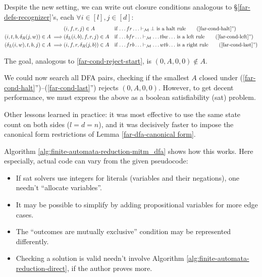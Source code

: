 Despite the new setting, we can write out closure conditions analogous to \S\ref{far-defs-recognizer}'s, each $\forall i\in[l],j\in[d]$:
\begin{align}
                                           & (i,f,r,j)\in A
                                           &                               & \text{if $\ldots fr\ldots\vdash_\mathcal{M}\bot$ is a halt rule}
    \tag{\ref{far-cond-halt}''}
    \\
    (i, t, b, \delta_R(j,w))\in A \implies & (\delta_L(i,b), f, r, j)\in A
                                           &                               & \text{if $\ldots bfr\ldots\vdash_\mathcal{M}\ldots tbw\ldots$ is a left rule}
    \tag{\ref{far-cond-left}''}
    \\
    (\delta_L(i,w), t, b, j)\in A \implies & (i, f, r, \delta_R(j,b))\in A
                                           &                               & \text{if $\ldots frb\ldots\vdash_\mathcal{M}\ldots wtb\ldots$ is a right rule}
    \tag{\ref{far-cond-last}''}
\end{align}

The goal, analogous to \eqref{far-cond-reject-start}, is $(0, A, 0, 0)\notin A$.

We could now search all DFA pairs, checking if the smallest $A$ closed under (\ref{far-cond-halt}'')--(\ref{far-cond-last}'') rejects $(0,A,0,0)$.
However, to get decent performance, we must express the above as a boolean satisfiability ({\sc sat}) problem.

Other lessons learned in practice:
it was most effective to use the same state count on both sides ($l=d=n$),
and it was decisively faster to impose the canonical form restrictions of Lemma \ref{far-dfa-canonical form}.

Algorithm \ref{alg:finite-automata-reduction-mitm_dfa} shows how this works.
Here especially, actual code can vary from the given pseudocode:
\begin{itemize}
    \item If {\sc sat} solvers use integers for literals (variables and their negations), one needn't ``allocate variables''.
    \item It may be possible to simplify by adding propositional variables for more edge cases.
    \item The ``outcomes are mutually exclusive'' condition may be represented differently.
    \item Checking a solution is valid needn't involve Algorithm \ref{alg:finite-automata-reduction-direct}, if the author proves more.
\end{itemize}

